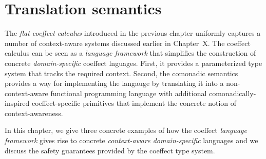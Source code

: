 \documentclass[
		twoside,openright,titlepage,numbers=noenddot,headinclude,%
                footinclude=true,cleardoublepage=empty,
                BCOR=10mm,paper=a4,fontsize=10pt, %
                ngerman,american, %
                ]{scrreprt}
\begin{document}
\frenchspacing %
\raggedbottom %
\pagestyle{plain} %




\newcommand{\semdeff}[4]{
\begin{array}{rcl}
  #1 & = & #3 \\ \cline{1-1}\cline{3-3}
  #2 & = & #4 \\
\end{array}  
}
\newcommand{\semdefff}[6]{
\begin{array}{rcl}
  #1 & = & #4 \\
  #2 & = & #5 \\ \cline{1-1}\cline{3-3}
  #3 & = & #6 \\
\end{array}  
}
\newcommand{\semdef}[2]{
\begin{array}{rcl}
  ~ & ~ & ~ \\ \cline{1-1}\cline{3-3}
  #1 & = & #2 \\
\end{array}  
}

\chapter{Translation semantics}
\renewcommand*\thesection{\arabic{section}}

The \emph{flat coeffect calculus} introduced in the previous chapter uniformly captures a number
of context-aware systems discussed earlier in Chapter~X. The coeffect calculus can be seen
as a \emph{language framework} that simplifies the construction of concrete \emph{domain-specific}
coeffect lnguages. First, it provides a parameterized type system that tracks the required context.
Second, the comonadic semantics provides a way for implementing the langauge by translating
it into a non-context-aware functional programming language with additional comonadically-inspired
coeffect-specific primitives that implement the concrete notion of context-awareness.

In this chapter, we give three concrete examples of how the coeffect \emph{language framework}
gives rise to concrete \emph{context-aware domain-specific} languages and we discuss the safety
guarantees provided by the coeffect type system.
\end{document}
